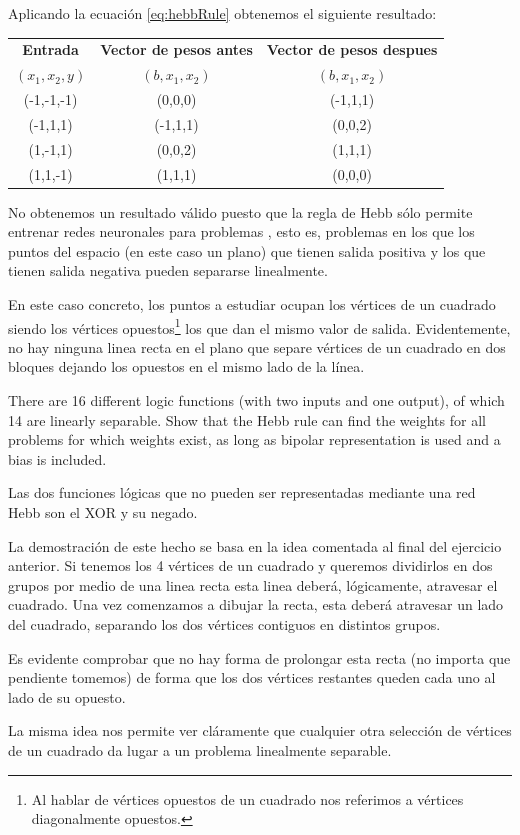 \begin{problem}[1]
Aplicando la ecuación \ref{eq:hebbRule} obtenemos el siguiente resultado:
\begin{center}
\begin{tabular}{|c|c|c|}
\hline
\textbf{Entrada} & \textbf{Vector de pesos antes} & \textbf{Vector de pesos despues} \\
$(x_1,x_2,y)$ & $(b,x_1,x_2)$ & $(b,x_1,x_2)$\\
\hline
(-1,-1,-1) & (0,0,0) & (-1,1,1)\\
(-1,1,1) & (-1,1,1) & (0,0,2)\\
(1,-1,1) & (0,0,2) & (1,1,1)\\
(1,1,-1) & (1,1,1) & (0,0,0)\\
\hline
\end{tabular}
\end{center}

No obtenemos un resultado válido puesto que la regla de Hebb sólo permite entrenar redes neuronales para problemas , esto es, problemas en los que los puntos del espacio (en este caso un plano) que tienen salida positiva y los que tienen salida negativa pueden separarse linealmente.

En este caso concreto, los puntos a estudiar ocupan los vértices de un cuadrado siendo los vértices opuestos\footnote{Al hablar de vértices opuestos de un cuadrado nos referimos a vértices diagonalmente opuestos.} los que dan el mismo valor de salida. Evidentemente, no hay ninguna linea recta en el plano que separe vértices de un cuadrado en dos bloques dejando los opuestos en el mismo lado de la línea.


\end{problem}

\begin{problem}[2]
There are 16 different logic functions (with two inputs and one output), of which 14
are linearly separable. Show that the Hebb rule can find the weights for all problems
for which weights exist, as long as bipolar representation is used and a bias is included.

\solution

Las dos funciones lógicas que no pueden ser representadas mediante una red Hebb son el XOR y su negado.

La demostración de este hecho se basa en la idea comentada al final del ejercicio anterior. Si tenemos los 4 vértices de un cuadrado y queremos dividirlos en dos grupos por medio de una linea recta esta linea deberá, lógicamente, atravesar el cuadrado. Una vez comenzamos a dibujar la recta, esta deberá atravesar un lado del cuadrado, separando los dos vértices contiguos en distintos grupos.

Es evidente comprobar que no hay forma de prolongar esta recta (no importa que pendiente tomemos) de forma que los dos vértices restantes queden cada uno al lado de su opuesto.

La misma idea nos permite ver cláramente que cualquier otra selección de vértices de un cuadrado da lugar a un problema linealmente separable.

\end{problem}

